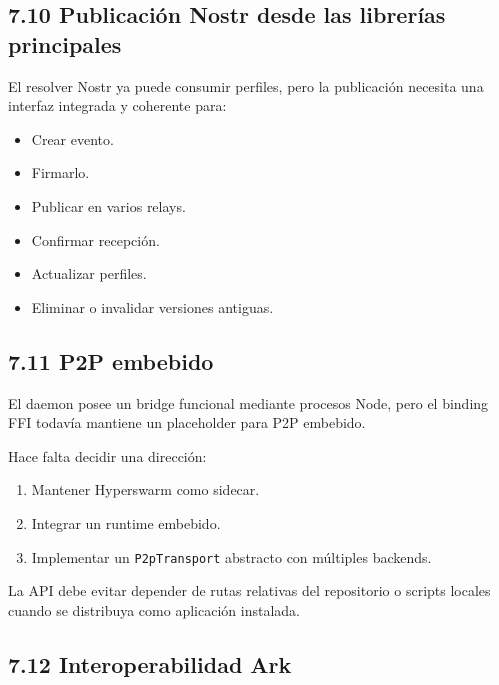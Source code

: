 \documentclass[
]{article}
\providecommand{\tightlist}{%
  \setlength{\itemsep}{0pt}\setlength{\parskip}{0pt}}
\begin{document}
\hypertarget{publicaciuxf3n-nostr-desde-las-libreruxedas-principales}{%
\subsection{7.10 Publicación Nostr desde las librerías
principales}\label{publicaciuxf3n-nostr-desde-las-libreruxedas-principales}}

El resolver Nostr ya puede consumir perfiles, pero la publicación
necesita una interfaz integrada y coherente para:

\begin{itemize}
\tightlist
\item
  Crear evento.
\item
  Firmarlo.
\item
  Publicar en varios relays.
\item
  Confirmar recepción.
\item
  Actualizar perfiles.
\item
  Eliminar o invalidar versiones antiguas.
\end{itemize}

\hypertarget{p2p-embebido}{%
\subsection{7.11 P2P embebido}\label{p2p-embebido}}

El daemon posee un bridge funcional mediante procesos Node, pero el
binding FFI todavía mantiene un placeholder para P2P embebido.

Hace falta decidir una dirección:

\begin{enumerate}
\def\labelenumi{\arabic{enumi}.}
\tightlist
\item
  Mantener Hyperswarm como sidecar.
\item
  Integrar un runtime embebido.
\item
  Implementar un \texttt{P2pTransport} abstracto con múltiples backends.
\end{enumerate}

La API debe evitar depender de rutas relativas del repositorio o scripts
locales cuando se distribuya como aplicación instalada.

\hypertarget{interoperabilidad-ark}{%
\subsection{7.12 Interoperabilidad Ark}\label{interoperabilidad-ark}}
\end{document}
